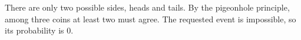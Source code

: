 There are only two possible sides, heads and tails. By the pigeonhole principle, among three coins at least two must agree. The requested event is impossible, so its probability is $\boxed0 $.
